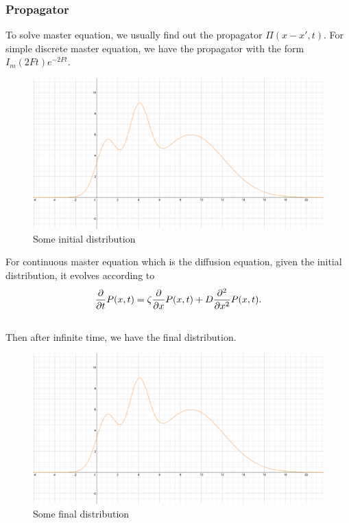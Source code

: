\documentclass[letterpaper,10pt,english]{sphinxmanual}
\begin{document}
\subsubsection{Propagator}
\label{nonequilibrium/week12:index-0}\label{nonequilibrium/week12:propagator}
To solve master equation, we usually find out the propagator $\Pi(x-x',t)$. For simple discrete master equation, we have the propagator with the form $I_m(2Ft)e^{-2Ft}$.
\begin{figure}[htbp]
\centering
\capstart

\includegraphics[width=0.900\linewidth]{distInit.png}
\caption{Some initial distribution}\end{figure}

For continuous master equation which is the diffusion equation, given the initial distribution, it evolves according to
\begin{gather}
\begin{split}\frac{\partial}{\partial t} P(x,t) = \zeta \frac{\partial}{\partial x} P(x,t) + D \frac{\partial^2}{\partial x^2} P(x,t) .\end{split}\notag\\\begin{split}\end{split}\notag
\end{gather}
Then after infinite time, we have the final distribution.
\begin{figure}[htbp]
\centering
\capstart

\includegraphics[width=0.900\linewidth]{distInit.png}
\caption{Some final distribution}\end{figure}
\end{document}
